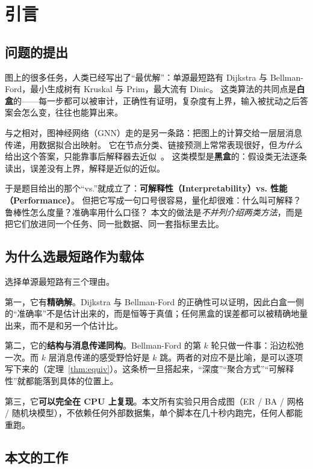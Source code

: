 \section{引言}\label{sec:intro}

\subsection{问题的提出}

图上的很多任务，人类已经写出了“最优解”：单源最短路有 Dijkstra 与 Bellman-Ford，最小生成树有 Kruskal 与 Prim，最大流有 Dinic。
这类算法的共同点是\textbf{白盒}的——每一步都可以被审计，正确性有证明，复杂度有上界，输入被扰动之后答案会怎么变，往往也能算出来。

与之相对，图神经网络（GNN）走的是另一条路：把图上的计算交给一层层消息传递，用数据拟合出映射。
它在节点分类、链接预测上常常表现很好，但\emph{为什么}给出这个答案，只能靠事后解释器去近似~\cite{ying2019gnnexplainer}。
这类模型是\textbf{黑盒}的：假设类无法逐条读出，误差没有上界，解释是近似的近似。

于是题目给出的那个“vs.”就成立了：\textbf{可解释性（Interpretability）vs. 性能（Performance）}。
但把它写成一句口号很容易，量化却很难：什么叫可解释？鲁棒性怎么度量？准确率用什么口径？
本文的做法是\emph{不并列介绍两类方法}，而是把它们放进同一个任务、同一批数据、同一套指标里去比。

\subsection{为什么选最短路作为载体}

选择单源最短路有三个理由。

第一，它有\textbf{精确解}。Dijkstra 与 Bellman-Ford 的正确性可以证明，因此白盒一侧的“准确率”不是估计出来的，而是恒等于真值；任何黑盒的误差都可以被精确地量出来，而不是和另一个估计比。

第二，它的\textbf{结构与消息传递同构}。Bellman-Ford 的第 $k$ 轮只做一件事：沿边松弛一次。而 $k$ 层消息传递的感受野恰好是 $k$ 跳。两者的对应不是比喻，是可以逐项写下来的（定理~\ref{thm:equiv}）。这条桥一旦搭起来，“深度”“聚合方式”“可解释性”就都能落到具体的位置上。

第三，它\textbf{可以完全在 CPU 上复现}。本文所有实验只用合成图（ER / BA / 网格 / 随机块模型），不依赖任何外部数据集，单个脚本在几十秒内跑完，任何人都能重跑。

\subsection{本文的工作}

